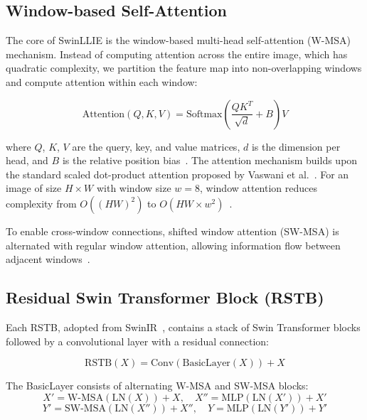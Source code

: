 \documentclass[conference]{IEEEtran}
\begin{document}
\subsection{Window-based Self-Attention}

The core of SwinLLIE is the window-based multi-head self-attention (W-MSA) mechanism. Instead of computing attention across the entire image, which has quadratic complexity, we partition the feature map into non-overlapping windows and compute attention within each window:

\begin{equation}
\text{Attention}(Q, K, V) = \text{Softmax}\left(\frac{QK^T}{\sqrt{d}} + B\right)V
\end{equation}

where $Q$, $K$, $V$ are the query, key, and value matrices, $d$ is the dimension per head, and $B$ is the relative position bias~\cite{liu2021swin}. The attention mechanism builds upon the standard scaled dot-product attention proposed by Vaswani et al.~\cite{vaswani2017attention}. For an image of size $H \times W$ with window size $w = 8$, window attention reduces complexity from $O((HW)^2)$ to $O(HW \times w^2)$~\cite{liu2021swin}.

To enable cross-window connections, shifted window attention (SW-MSA) is alternated with regular window attention, allowing information flow between adjacent windows~\cite{liu2021swin}.

\subsection{Residual Swin Transformer Block (RSTB)}

Each RSTB, adopted from SwinIR~\cite{liang2021swinir}, contains a stack of Swin Transformer blocks followed by a convolutional layer with a residual connection:

\begin{equation}
\text{RSTB}(X) = \text{Conv}(\text{BasicLayer}(X)) + X
\end{equation}

The BasicLayer consists of alternating W-MSA and SW-MSA blocks:
\begin{equation}
X' = \text{W-MSA}(\text{LN}(X)) + X, \quad X'' = \text{MLP}(\text{LN}(X')) + X'
\end{equation}
\begin{equation}
Y' = \text{SW-MSA}(\text{LN}(X'')) + X'', \quad Y = \text{MLP}(\text{LN}(Y')) + Y'
\end{equation}
\end{document}

